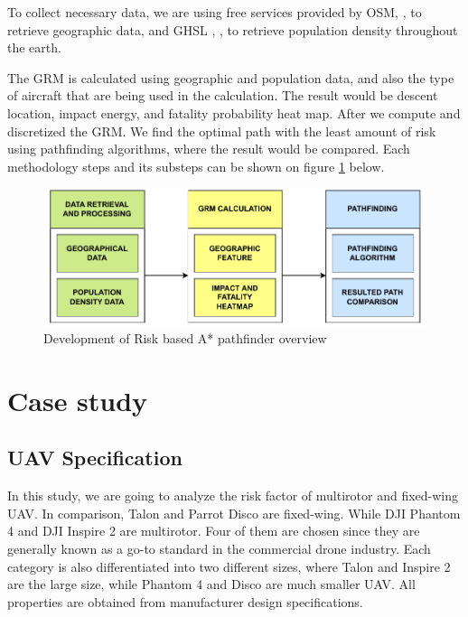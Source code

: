 \documentclass[12pt]{report}
\begin{document}
        To collect necessary data, we are using free services provided by \ac{OSM},
        \cite{openstreetmap_contributors_planet_2017}, to retrieve geographic data, and \ac{GHSL} ,
        \cite{commission_ghsl_2023}, to retrieve population density throughout the earth.

        The \ac{GRM} is calculated using geographic and population data, and also the type of aircraft that are being
        used in the calculation. The result would be descent location, impact energy, and fatality probability heat map.
        After we compute and discretized the GRM. We find the optimal path with the least amount of risk using
        pathfinding algorithms, where the result would be compared. Each methodology steps and its substeps can be shown
        on figure \ref{fig:general} below.

        \begin{figure}[H]
            \centering
            \includegraphics[width=\textwidth]{General Image/OSM Drone-General Overview.pdf}
            \caption{Development of Risk based A* pathfinder overview}
            \label{fig:general}
        \end{figure}


    \section{Case study}
        \subsection{UAV Specification}
        In this study, we are going to analyze the risk factor of multirotor and fixed-wing UAV. In comparison, Talon
        and Parrot Disco are fixed-wing. While DJI Phantom 4 and DJI Inspire 2 are multirotor. Four of them are chosen
        since they are generally known as a go-to standard in the commercial drone industry. Each category is also
        differentiated into two different sizes, where Talon and Inspire 2 are the large size, while Phantom 4 and Disco
        are much smaller UAV. All properties are obtained from manufacturer design specifications.
            
\end{document}
